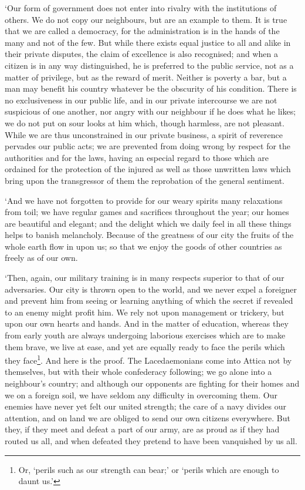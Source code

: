 `Our form of government does not enter into rivalry with the
institutions of others. We do not copy our neighbours, but are an
example to them. It is true that we are called a democracy, for the
administration is in the hands of the many and not of the few. But
while there exists equal justice to all and alike in their private
disputes, the claim of excellence is also recognised; and when a
 citizen is in any way distinguished, he is preferred to the
public service, not as a matter of privilege, but as the reward of
merit. Neither is poverty a bar, but a man may benefit his country
whatever be the obscurity of his condition. There is no exclusiveness
in our public life, and in our private intercourse we are not
suspicious of one another, nor angry with our neighbour if he does
what he likes; we do not put on sour looks at him which, though
harmless, are not pleasant. While we are thus unconstrained in our
private business, a spirit of reverence pervades our public acts; we
are prevented from doing wrong by respect for the authorities and for
the laws, having an especial regard to those which are ordained for
the protection of the injured as well as those unwritten laws which
bring upon the transgressor of them the reprobation of the general
sentiment.

`And we have not forgotten to provide for our weary spirits many
relaxations from toil; we have regular games and sacrifices throughout
the year; our homes are beautiful and elegant; and the delight which
we daily feel in all these things helps to banish melancholy. Because
of the greatness of our city the fruits of the whole earth flow in
upon us; so that we enjoy the goods of other countries as freely as of
our own.

`Then, again, our military training is in many respects superior to
that of our adversaries. Our city is thrown open to the world, and we
never expel a foreigner and prevent him from seeing or learning
anything of which the secret if revealed to an enemy might profit him.
We rely not upon management or trickery, but upon our own hearts and
hands. And in the matter of education, whereas they from early youth
are always undergoing laborious exercises which are to make them
brave, we live at ease, and yet are equally  ready to face
the perils which they face\footnote{Or, `perils such as our strength
can bear;' or `perils which are enough to daunt us.'}. And here is the
proof. The Lacedaemonians come into Attica not by themselves, but with
their whole confederacy following; we go alone into a neighbour's
country; and although our opponents are fighting for their homes and
we on a foreign soil, we have seldom any difficulty in overcoming
them. Our enemies have never yet felt our united strength; the care of
a navy divides our attention, and on land we are obliged to send our
own citizens everywhere. But they, if they meet and defeat a part of
our army, are as proud as if they had routed us all, and when defeated
they pretend to have been vanquished by us all.

